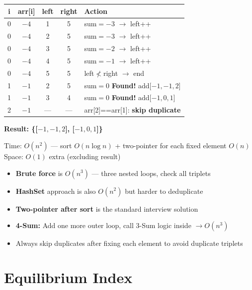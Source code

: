 \documentclass[12pt,a4paper,oneside]{book}
\begin{document}
\begin{dryrun}[Dry Run: arr after sort = \{$-4,-1,-1,0,1,2$\}]
\begin{center}
\begin{tabular}{ccccp{4.5cm}}
\toprule
\textbf{i} & \textbf{arr[i]} & \textbf{left} & \textbf{right} & \textbf{Action}\\
\midrule
0 & $-4$ & 1 & 5 & sum$=-3$ $\to$ left++\\
0 & $-4$ & 2 & 5 & sum$=-3$ $\to$ left++\\
0 & $-4$ & 3 & 5 & sum$=-2$ $\to$ left++\\
0 & $-4$ & 4 & 5 & sum$=-1$ $\to$ left++\\
0 & $-4$ & 5 & 5 & left$\not<$right $\to$ end\\
\midrule
1 & $-1$ & 2 & 5 & sum$=0$ \textbf{Found!} add[$-1,-1,2$]\\
1 & $-1$ & 3 & 4 & sum$=0$ \textbf{Found!} add[$-1,0,1$]\\
\midrule
2 & $-1$ & --- & --- & arr[2]==arr[1]: \textbf{skip duplicate}\\
\bottomrule
\end{tabular}
\end{center}
\textbf{Result: \{[$-1,-1,2$], [$-1,0,1$]\}}
\end{dryrun}

\begin{complexity}
Time: $O(n^2)$ --- sort $O(n\log n)$ + two-pointer for each fixed element $O(n)$\quad Space: $O(1)$ extra (excluding result)
\end{complexity}

\begin{interviewcorner}
\begin{itemize}
  \item \textbf{Brute force} is $O(n^3)$ --- three nested loops, check all triplets
  \item \textbf{HashSet} approach is also $O(n^2)$ but harder to deduplicate
  \item \textbf{Two-pointer after sort} is the standard interview solution
  \item \textbf{4-Sum:} Add one more outer loop, call 3-Sum logic inside $\to O(n^3)$
  \item Always skip duplicates after fixing each element to avoid duplicate triplets
\end{itemize}
\end{interviewcorner}

\section{Equilibrium Index}
\end{document}
